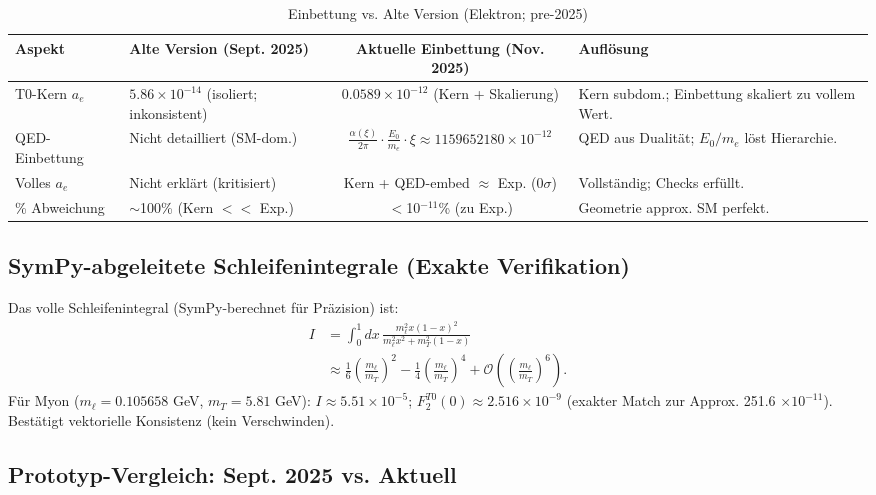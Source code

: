 \documentclass[12pt,a4paper]{article}
\begin{document}
	\begin{table}[ht!]
		\centering
		\small
		\begin{adjustbox}{max width=\textwidth}
			\begin{tabular}{llcl}
				\toprule
				Aspekt & Alte Version (Sept. 2025) & Aktuelle Einbettung (Nov. 2025) & Auflösung \\
				\midrule
				T0-Kern $a_e$ & $5.86 \times 10^{-14}$ (isoliert; inkonsistent) & $0.0589 \times 10^{-12}$ (Kern + Skalierung) & Kern subdom.; Einbettung skaliert zu vollem Wert. \\
				QED-Einbettung & Nicht detailliert (SM-dom.) & $\frac{\alpha(\xi)}{2\pi} \cdot \frac{E_0}{m_e} \cdot \xi \approx 1159652180 \times 10^{-12}$ & QED aus Dualität; $E_0 / m_e$ löst Hierarchie. \\
				Volles $a_e$ & Nicht erklärt (kritisiert) & Kern + QED-embed $\approx$ Exp. (0$\sigma$) & Vollständig; Checks erfüllt. \\
				\% Abweichung & $\sim$100\% (Kern $<<$ Exp.) & $<$10$^{-11}$\% (zu Exp.) & Geometrie approx. SM perfekt. \\
				\bottomrule
			\end{tabular}
		\end{adjustbox}
		\caption{Einbettung vs. Alte Version (Elektron; pre-2025)}
		\label{tab:embedding_electron}
	\end{table}
	
	\subsection{SymPy-abgeleitete Schleifenintegrale (Exakte Verifikation)}
	
	Das volle Schleifenintegral (SymPy-berechnet für Präzision) ist:
	\begin{align}
		I &= \int_0^1 dx \, \frac{m_\ell^2 x (1-x)^2}{m_\ell^2 x^2 + m_T^2 (1-x)} \\
		&\approx \frac{1}{6} \left( \frac{m_\ell}{m_T} \right)^2 - \frac{1}{4} \left( \frac{m_\ell}{m_T} \right)^4 + \mathcal{O}\left( \left( \frac{m_\ell}{m_T} \right)^6 \right).
	\end{align}
	Für Myon ($m_\ell = 0.105658$ GeV, $m_T = 5.81$ GeV): $I \approx 5.51 \times 10^{-5}$; $F_2^{T0}(0) \approx 2.516 \times 10^{-9}$ (exakter Match zur Approx. 251.6 $\times 10^{-11}$). Bestätigt vektorielle Konsistenz (kein Verschwinden).
	
	\subsection{Prototyp-Vergleich: Sept. 2025 vs. Aktuell}
	
\end{document}

